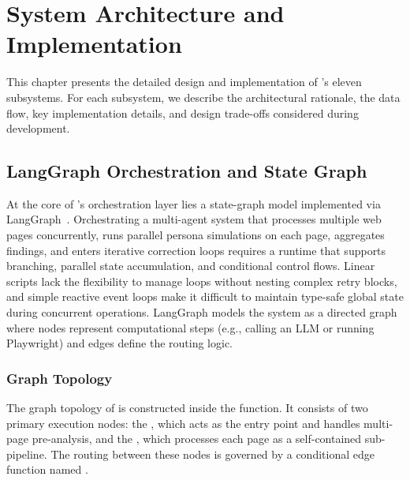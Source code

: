 \chapter{System Architecture and Implementation}
\label{ch:architecture}

This chapter presents the detailed design and implementation of \versimux{}'s eleven subsystems. For each subsystem, we describe the architectural rationale, the data flow, key implementation details, and design trade-offs considered during development.


\section{LangGraph Orchestration and State Graph}
\label{sec:langgraph}

At the core of \versimux{}'s orchestration layer lies a state-graph model implemented via LangGraph~\cite{langgraph}. Orchestrating a multi-agent system that processes multiple web pages concurrently, runs parallel persona simulations on each page, aggregates findings, and enters iterative correction loops requires a runtime that supports branching, parallel state accumulation, and conditional control flows. Linear scripts lack the flexibility to manage loops without nesting complex retry blocks, and simple reactive event loops make it difficult to maintain type-safe global state during concurrent operations. LangGraph models the system as a directed graph where nodes represent computational steps (e.g., calling an LLM or running Playwright) and edges define the routing logic.

\subsection{Graph Topology}
\label{sec:graph-topology}

The graph topology of \versimux{} is constructed inside the  function. It consists of two primary execution nodes: the , which acts as the entry point and handles multi-page pre-analysis, and the , which processes each page as a self-contained sub-pipeline. The routing between these nodes is governed by a conditional edge function named . 

